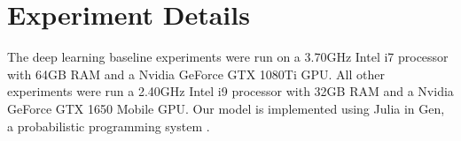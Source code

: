 \section{Experiment Details}

The deep learning baseline experiments were run on a 3.70GHz Intel i7 processor with 64GB RAM and a Nvidia GeForce GTX 1080Ti GPU. All other experiments were run a 2.40GHz Intel i9 processor with 32GB RAM and a Nvidia GeForce GTX 1650 Mobile GPU. Our model is implemented using Julia in Gen, a probabilistic programming system \cite{cusumano2019gen}.

